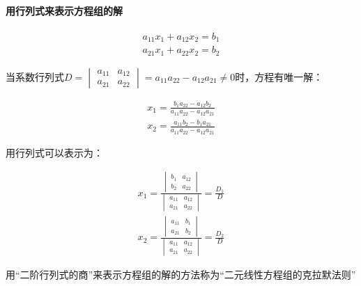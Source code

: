 \documentclass[UTF8]{ctexbook}
\begin{document}
\paragraph{用行列式来表示方程组的解}

\begin{equation}
\begin{aligned}
a_{11}x_{1}+a_{12}x_{2}=b_{1} \\
a_{21}x_{1}+a_{22}x_{2}=b_{2}
\end{aligned}
\end{equation}

当系数行列式$D=\begin{vmatrix} a_{11} & a_{12} \\ a_{21} & a_{22} \end{vmatrix}=a_{11}a_{22}-a_{12}a_{21} \neq 0$时，方程有唯一解：

\begin{equation}
\begin{aligned}
x_{1}=\frac{b_{1}a_{22}-a_{12}b_{2}}{a_{11}a_{22}-a_{12}a_{21}}\\
x_{2}=\frac{a_{11}b_{2}-b_{1}a_{21}}{a_{11}a_{22}-a_{12}a_{21}}
\end{aligned}
\end{equation}

用行列式可以表示为：

\begin{equation}
\begin{aligned}
x_{1}=\frac{\begin{vmatrix} b_{1} & a_{12} \\ b_{2} & a_{22} \end{vmatrix}}{\begin{vmatrix} a_{11} & a_{12} \\ a_{21} & a_{22} \end{vmatrix}}=\frac{D_{1}}{D}\\
x_{2}=\frac{\begin{vmatrix} a_{11} & b_{1} \\ a_{21} & b_{2} \end{vmatrix}}{\begin{vmatrix} a_{11} & a_{12} \\ a_{21} & a_{22} \end{vmatrix}}=\frac{D_{2}}{D}
\end{aligned}
\end{equation}

用“二阶行列式的商”来表示方程组的解的方法称为“二元线性方程组的克拉默法则”
\end{document}

